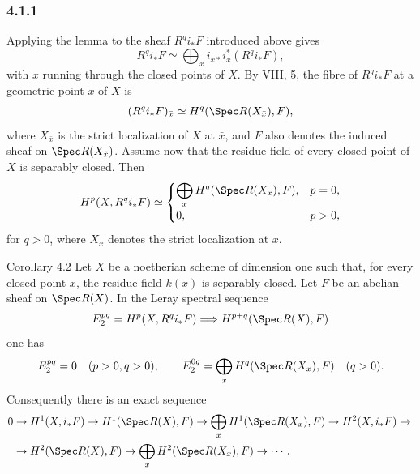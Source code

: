 \subsubsection*{4.1.1}
Applying the lemma to the sheaf \(R^qi_*F\) introduced above gives
\[
R^qi_*F\simeq \bigoplus_x i_{x*}i_x^*(R^qi_*F),
\]
with \(x\) running through the closed points of \(X\). By VIII, 5, the fibre of \(R^qi_*F\) at a geometric point \(\bar x\) of \(X\) is
\[
(R^qi_*F)_{\bar x}\simeq H^q(\Spec R(X_{\bar x}),F),
\]
where \(X_{\bar x}\) is the strict localization of \(X\) at \(\bar x\), and \(F\) also denotes the induced sheaf on \(\Spec R(X_{\bar x})\). Assume now that the residue field of every closed point of \(X\) is separably closed. Then
\[
H^p(X,R^qi_*F)\simeq
\begin{cases}
\displaystyle\bigoplus_x H^q(\Spec R(X_x),F),&p=0,\\
0,&p>0,
\end{cases}
\]
for \(q>0\), where \(X_x\) denotes the strict localization at \(x\).

\begin{statement}{Corollary 4.2}
Let \(X\) be a noetherian scheme of dimension one such that, for every closed point \(x\), the residue field \(k(x)\) is separably closed. Let \(F\) be an abelian sheaf on \(\Spec R(X)\). In the Leray spectral sequence
\[
E_2^{pq}=H^p(X,R^qi_*F)\Longrightarrow H^{p+q}(\Spec R(X),F)
\]
one has
\[
E_2^{pq}=0\quad(p>0, q>0),\qquad
E_2^{0q}=\bigoplus_x H^q(\Spec R(X_x),F)\quad(q>0).
\]
Consequently there is an exact sequence
\[
\begin{aligned}
0&\to H^1(X,i_*F)\to H^1(\Spec R(X),F)\to\bigoplus_x H^1(\Spec R(X_x),F)\to H^2(X,i_*F)\to{}\\
&\to H^2(\Spec R(X),F)\to\bigoplus_x H^2(\Spec R(X_x),F)\to\cdots .
\end{aligned}
\]
\end{statement}

